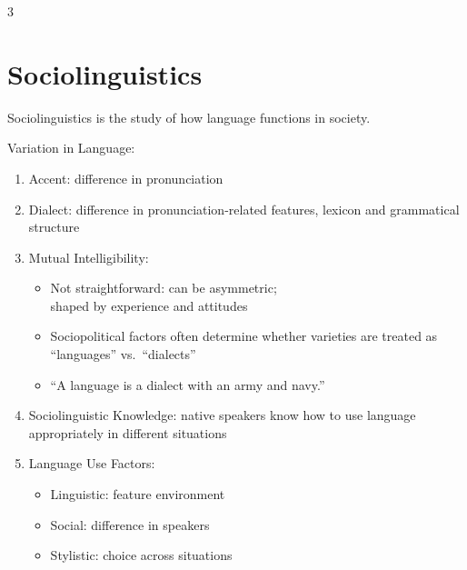 \documentclass[12pt, a4paper]{article}
\begin{document}
\begin{multicols*}{3}
\section{Sociolinguistics}
Sociolinguistics is the study of how language functions in society.

Variation in Language:
\begin{enumerate}[\roman*.]
  \item Accent: difference in pronunciation
  \item Dialect: difference in pronunciation-related features, lexicon and grammatical structure
  \item Mutual Intelligibility:
    \begin{itemize}[leftmargin=*]\vspace{3pt}
      \item Not straightforward: can be asymmetric; \\shaped by experience and attitudes
      \item Sociopolitical factors often determine whether varieties are treated as ``languages'' vs.\ ``dialects''
      \item ``A language is a dialect with an army and navy.''
    \end{itemize}
  \item Sociolinguistic Knowledge: native speakers know how to use language appropriately in different situations 
  \item Language Use Factors:
    \begin{itemize}[leftmargin=*]\vspace{3pt}
      \item Linguistic: feature environment 
      \item Social: difference in speakers
      \item Stylistic: choice across situations
    \end{itemize}
\end{enumerate}


\end{multicols*}
\end{document}
